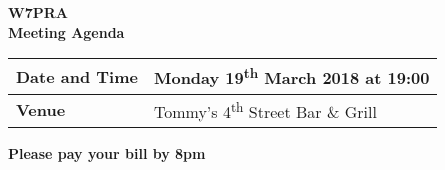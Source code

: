 \documentclass[letter,11pt]{extarticle}
\begin{document}
	\thispagestyle{empty}
	
	\begin{center}
		\textbf{W7PRA\\Meeting Agenda}
		\vspace{0.33cm}
	\end{center}
	
	\begin{center}
		\begin{tabular}{| m{3.0cm} | m{7.5cm} |} \hline
			\textbf{Date and Time} & Monday 19\textsuperscript{th} March 2018 at 19:00 \\ \hline
			\textbf{Venue} & Tommy's 4\textsuperscript{th} Street Bar \& Grill \\ \hline
				\end{tabular}
	\end{center}
	
	\begin{center}
		\textbf{Please pay your bill by 8pm}
	\end{center}
	
\end{document}
